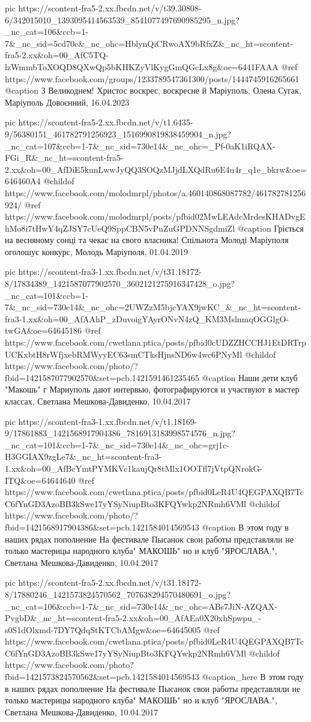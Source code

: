      pic https://scontent-fra5-2.xx.fbcdn.net/v/t39.30808-6/342015010_1393095414563539_8541077497690985295_n.jpg?_nc_cat=106&ccb=1-7&_nc_sid=5cd70e&_nc_ohc=HblynQiCRwoAX9bRfxZ&_nc_ht=scontent-fra5-2.xx&oh=00_AfC5TQ-lzWmmbToXOQD8QXwQp5bKHKZyVlKygGmQGcLx8g&oe=6441FAAA
     @ref https://www.facebook.com/groups/1233789547361300/posts/1444745916265661
     @caption З Великоднем! Христос воскрес, воскресне й Маріуполь, Олена Сугак, Маріуполь Довоєнний, 16.04.2023

     pic https://scontent-fra5-2.xx.fbcdn.net/v/t1.6435-9/56380151_461782791256923_1516990819838459904_n.jpg?_nc_cat=107&ccb=1-7&_nc_sid=730e14&_nc_ohc=_Pf-0aK1iRQAX-FGi_R&_nc_ht=scontent-fra5-2.xx&oh=00_AfDiE5kunLwwJyQQ3SOQzMJjdLXQdRu6E4u4r_q1e_bkrw&oe=646460A4
     @childof https://www.facebook.com/molodmrpl/photos/a.460140868087782/461782781256924/
     @ref https://www.facebook.com/molodmrpl/posts/pfbid02MwLEAdcMrdesKHADvgEhMo8i7tHwY4qZJSY7cUeQ9SppCBN5vPuZuGPDNNSgdmiZl
     @caption Гріється на весняному сонці та чекає на свого власника! Спільнота Молоді Маріуполя оголошує конкурс, Молодь Маріуполя, 01.04.2019 

     pic https://scontent-fra3-1.xx.fbcdn.net/v/t31.18172-8/17834389_1421587077902570_3602121275916347428_o.jpg?_nc_cat=101&ccb=1-7&_nc_sid=730e14&_nc_ohc=2UWZzM5bjcYAX9jwKC_&_nc_ht=scontent-fra3-1.xx&oh=00_AfAAhP_zDuvoigYAyrONvN4zQ_KM3MslnmqOGGlgO-twGA&oe=64645186
     @ref https://www.facebook.com/cwetlana.ptica/posts/pfbid0cUDZZHCCHJ1EtDRTrpUCKxbtH8rWfjxebRMWyyEC63smCTksHjnsND6w4wc6PNyMl
     @childof https://www.facebook.com/photo/?fbid=1421587077902570&set=pcb.1421591461235465
     @caption Наши дети клуб "Макошь" г Мариуполь дают интервью, фотографируются и участвуют в мастер классах, Светлана Мешкова-Давиденко, 10.04.2017

     pic https://scontent-fra3-1.xx.fbcdn.net/v/t1.18169-9/17861883_1421568917904386_7816913183998574576_n.jpg?_nc_cat=101&ccb=1-7&_nc_sid=730e14&_nc_ohc=grj1c-H3GGIAX9zgLe7&_nc_ht=scontent-fra3-1.xx&oh=00_AfBcYmtPYMKVc1kaujQr8tMlx1OOTfl7jVtpQNrokG-ITQ&oe=64644640
     @ref https://www.facebook.com/cwetlana.ptica/posts/pfbid0LeR4U4QEGPAXQB7TcC6fYnGD3AzoBB3kSwe17yYSyNiupBto3KFQYwkp2NRmh6VMl
     @childof https://www.facebook.com/photo/?fbid=1421568917904386&set=pcb.1421584014569543
     @caption В этом году в наших рядах пополнение На фестивале Пысанок свои работы представляли не только  мастерицы народного клуба" МАКОШЬ" но и клуб "ЯРОСЛАВА.", Светлана Мешкова-Давиденко, 10.04.2017

     pic https://scontent-fra5-2.xx.fbcdn.net/v/t31.18172-8/17880246_1421573824570562_707638294570480691_o.jpg?_nc_cat=106&ccb=1-7&_nc_sid=730e14&_nc_ohc=ABs7JiN-AZQAX-PvgbD&_nc_ht=scontent-fra5-2.xx&oh=00_AfAEa0X20xhSpwpu_-s0S1dOlxmd-7DY7QdqStKTCbAMgw&oe=64645005
     @ref https://www.facebook.com/cwetlana.ptica/posts/pfbid0LeR4U4QEGPAXQB7TcC6fYnGD3AzoBB3kSwe17yYSyNiupBto3KFQYwkp2NRmh6VMl
     @childof https://www.facebook.com/photo?fbid=1421573824570562&set=pcb.1421584014569543
     @caption_here В этом году в наших рядах пополнение На фестивале Пысанок свои работы представляли не только  мастерицы народного клуба" МАКОШЬ" но и клуб "ЯРОСЛАВА.", Светлана Мешкова-Давиденко, 10.04.2017


